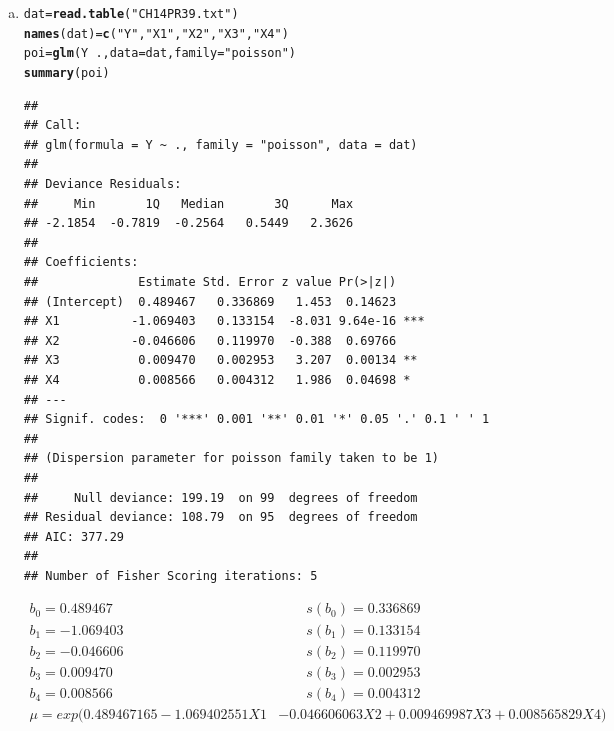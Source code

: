 \documentclass{article}\usepackage[]{graphicx}\usepackage[]{color}
\makeatletter
\newcommand{\hlstr}[1]{\textcolor[rgb]{0.192,0.494,0.8}{#1}}%
\newcommand{\hlopt}[1]{\textcolor[rgb]{0,0,0}{#1}}%
\newcommand{\hlstd}[1]{\textcolor[rgb]{0.345,0.345,0.345}{#1}}%
\newcommand{\hlkwb}[1]{\textcolor[rgb]{0.69,0.353,0.396}{#1}}%
\newcommand{\hlkwc}[1]{\textcolor[rgb]{0.333,0.667,0.333}{#1}}%
\newcommand{\hlkwd}[1]{\textcolor[rgb]{0.737,0.353,0.396}{\textbf{#1}}}%
\newenvironment{kframe}{%
 \def\at@end@of@kframe{}%
 \ifinner\ifhmode%
  \def\at@end@of@kframe{\end{minipage}}%
  \begin{minipage}{\columnwidth}%
 \fi\fi%
 \def\FrameCommand##1{\hskip\@totalleftmargin \hskip-\fboxsep
 \colorbox{shadecolor}{##1}\hskip-\fboxsep
     \hskip-\linewidth \hskip-\@totalleftmargin \hskip\columnwidth}%
 \MakeFramed {\advance\hsize-\width
   \@totalleftmargin\z@ \linewidth\hsize
   \@setminipage}}%
 {\par\unskip\endMakeFramed%
 \at@end@of@kframe}
\newenvironment{knitrout}{}{} %
\makeatother
\begin{document}
\begin{enumerate}[(a)]

\item

\begin{knitrout}
\color{fgcolor}\begin{kframe}
\begin{alltt}
  \hlstd{dat} \hlkwb{=} \hlkwd{read.table}\hlstd{(}\hlstr{"CH14PR39.txt"}\hlstd{)}
  \hlkwd{names}\hlstd{(dat)} \hlkwb{=} \hlkwd{c}\hlstd{(}\hlstr{"Y"}\hlstd{,} \hlstr{"X1"}\hlstd{,} \hlstr{"X2"}\hlstd{,} \hlstr{"X3"}\hlstd{,} \hlstr{"X4"}\hlstd{)}
  \hlstd{poi} \hlkwb{=} \hlkwd{glm}\hlstd{(Y} \hlopt{~} \hlstd{. ,} \hlkwc{data} \hlstd{= dat,} \hlkwc{family} \hlstd{=} \hlstr{"poisson"}\hlstd{)}
  \hlkwd{summary}\hlstd{(poi)}
\end{alltt}
\begin{verbatim}
## 
## Call:
## glm(formula = Y ~ ., family = "poisson", data = dat)
## 
## Deviance Residuals: 
##     Min       1Q   Median       3Q      Max  
## -2.1854  -0.7819  -0.2564   0.5449   2.3626  
## 
## Coefficients:
##              Estimate Std. Error z value Pr(>|z|)    
## (Intercept)  0.489467   0.336869   1.453  0.14623    
## X1          -1.069403   0.133154  -8.031 9.64e-16 ***
## X2          -0.046606   0.119970  -0.388  0.69766    
## X3           0.009470   0.002953   3.207  0.00134 ** 
## X4           0.008566   0.004312   1.986  0.04698 *  
## ---
## Signif. codes:  0 '***' 0.001 '**' 0.01 '*' 0.05 '.' 0.1 ' ' 1
## 
## (Dispersion parameter for poisson family taken to be 1)
## 
##     Null deviance: 199.19  on 99  degrees of freedom
## Residual deviance: 108.79  on 95  degrees of freedom
## AIC: 377.29
## 
## Number of Fisher Scoring iterations: 5
\end{verbatim}
\end{kframe}
\end{knitrout}

\begin{displaymath}
\begin{split}
  b_0 = 0.489467 &\qquad s(b_0)=0.336869 \\
  b_1 = -1.069403 &\qquad  s(b_1)=0.133154 \\
  b_2 = -0.046606 &\qquad  s(b_2)=0.119970 \\
  b_3 = 0.009470 &\qquad  s(b_3)=0.002953 \\
  b_4 = 0.008566 &\qquad  s(b_4)=0.004312 \\
  \mu = exp(0.489467165 -1.069402551 X1 & -0.046606063 X2 +  0.009469987X3 +  0.008565829 X4)
\end{split}
\end{displaymath}


\end{enumerate}
\end{document}

